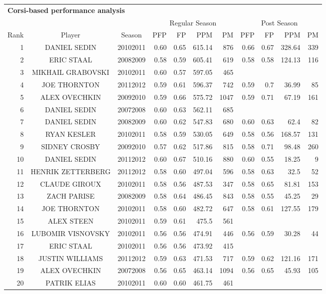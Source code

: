 \begin{table}[p]
        \centering\small
        \begin{tabular}{r c c | r r r r | r r r r }
        \multicolumn{11}{l}{\bf Corsi-based performance analysis}\\
            & & & \multicolumn{4}{|c}{Regular Season} & \multicolumn{4}{|c}{Post Season}\\
            Rank & Player & Season  & PFP & FP & PPM & PM &PFP & FP & PPM & PM  \\ 
            \hline\rule{0pt}{4ex} 
1&DANIEL SEDIN&20102011&0.60&0.65&615.14&876&0.66&0.67&328.64&339\\
2&ERIC STAAL&20082009&0.58&0.59&605.41&619&0.58&0.58&124.13&116\\
3&MIKHAIL GRABOVSKI&20102011&0.60&0.57&597.05&465&&&&\\
4&JOE THORNTON&20112012&0.59&0.61&596.37&742&0.59&0.7&36.99&85\\
5&ALEX OVECHKIN&20092010&0.59&0.66&575.72&1047&0.59&0.71&67.19&161\\
6&DANIEL SEDIN&20072008&0.60&0.63&562.11&685&&&&\\
7&DANIEL SEDIN&20082009&0.60&0.62&547.83&680&0.60&0.63&62.4&82\\
8&RYAN KESLER&20102011&0.58&0.59&530.05&649&0.58&0.56&168.57&131\\
9&SIDNEY CROSBY&20092010&0.57&0.62&517.86&815&0.58&0.71&98.48&260\\
10&DANIEL SEDIN&20112012&0.60&0.67&510.16&880&0.60&0.55&18.25&9\\
11&HENRIK ZETTERBERG&20112012&0.58&0.60&497.04&596&0.58&0.63&32.5&52\\
12&CLAUDE GIROUX&20102011&0.58&0.56&487.53&347&0.58&0.65&81.81&153\\
13&ZACH PARISE&20082009&0.58&0.64&486.45&843&0.58&0.55&45.25&29\\
14&JOE THORNTON&20102011&0.58&0.60&482.72&647&0.58&0.61&127.55&179\\
15&ALEX STEEN&20102011&0.59&0.61&475.5&561&&&&\\
16&LUBOMIR VISNOVSKY&20102011&0.56&0.56&474.91&446&0.56&0.59&30.28&44\\
17&ERIC STAAL&20102011&0.56&0.56&473.92&415&&&&\\
18&JUSTIN WILLIAMS&20112012&0.59&0.63&471.53&717&0.59&0.62&121.16&171\\
19&ALEX OVECHKIN&20072008&0.56&0.65&463.14&1094&0.56&0.65&45.93&105\\
20&PATRIK ELIAS&20102011&0.60&0.60&461.75&461&&&&\\

\end{tabular}
\end{table}

